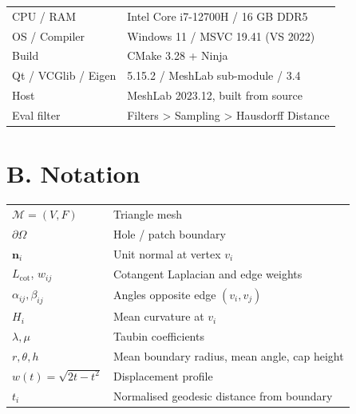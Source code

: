 \documentclass[12pt,a4paper]{report}
\begin{document}
\begin{table}[H]
\centering
\begin{tabularx}{\textwidth}{l X}
\toprule
CPU / RAM & Intel Core i7-12700H / 16 GB DDR5 \\
OS / Compiler & Windows 11 / MSVC 19.41 (VS 2022) \\
Build & CMake 3.28 + Ninja \\
Qt / VCGlib / Eigen & 5.15.2 / MeshLab sub-module / 3.4 \\
Host & MeshLab 2023.12, built from source \\
Eval filter & Filters \textgreater{} Sampling \textgreater{} Hausdorff Distance \\
\bottomrule
\end{tabularx}
\end{table}

\section*{B. Notation}

\begin{table}[H]
\centering
\begin{tabularx}{\textwidth}{l X}
\toprule
$\mathcal{M} = (V, F)$ & Triangle mesh \\
$\partial \Omega$ & Hole / patch boundary \\
$\mathbf{n}_i$ & Unit normal at vertex $v_i$ \\
$L_{\text{cot}}$, $w_{ij}$ & Cotangent Laplacian and edge weights \\
$\alpha_{ij}, \beta_{ij}$ & Angles opposite edge $(v_i, v_j)$ \\
$H_i$ & Mean curvature at $v_i$ \\
$\lambda, \mu$ & Taubin coefficients \\
$r, \theta, h$ & Mean boundary radius, mean angle, cap height \\
$w(t) = \sqrt{2t-t^2}$ & Displacement profile \\
$t_i$ & Normalised geodesic distance from boundary \\
\bottomrule
\end{tabularx}
\end{table}
\end{document}
